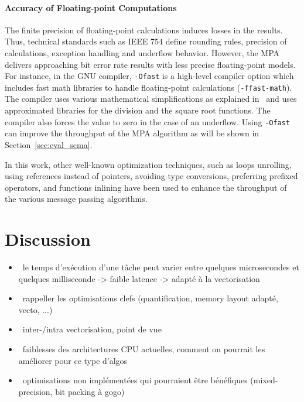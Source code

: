 \paragraph{Accuracy of Floating-point Computations}
\label{sec:opt_scma_float}

The finite precision of floating-point calculations induces losses in the
results. Thus, technical standards such as IEEE 754 define rounding rules,
precision of calculations, exception handling and underflow behavior. However,
the MPA delivers approaching bit error rate results with less precise
floating-point models. For instance, in the GNU compiler, \verb|-Ofast| is a
high-level compiler option which includes fast math libraries to handle
floating-point calculations (\verb|-ffast-math|). The compiler uses various
mathematical simplifications as explained in~\cite{Gccfp2018} and uses
approximated libraries for the division and the square root functions. The
compiler also forces the value to zero in the case of an underflow. Using
\verb|-Ofast| can improve the throughput of the MPA algorithm as will be shown
in Section~\ref{sec:eval_scma}.

In this work, other well-known optimization techniques, such as loops unrolling,
using references instead of pointers, avoiding type conversions, preferring
prefixed operators, and functions inlining have been used to enhance the
throughput of the various message passing algorithms.

\section{Discussion}

\begin{itemize}
  \item \xmark~le temps d’exécution d’une tâche peut varier entre quelques
    microsecondes et quelques milliseconde -> faible latence -> adapté à la
    vectorisation
  \item \xmark~rappeller les optimisations clefs (quantification, memory layout
    adapté, vecto, ...)
  \item \xmark~inter-/intra vectorisation, point de vue
  \item \xmark~faiblesses des architectures CPU actuelles, comment on pourrait
    les améliorer pour ce type d'algos
  \item \xmark~optimisations non implémentées qui pourraient être bénéfiques
    (mixed-precision, bit packing à gogo)
\end{itemize}